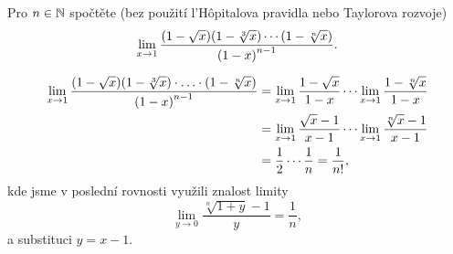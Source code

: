 \documentclass[answers]{exam}
\begin{document}
\begin{questions}
  \question[2] Pro $n \in \mathbb{N}$ spočtěte (bez použití l'Hôpitalova pravidla nebo Taylorova rozvoje)
  \begin{equation*}
    \lim_{x \to 1} 
    \frac{
      \parens{1 - \sqrt{x}} \parens{1 - \sqrt[3]{x}} \cdots \parens{1 - \sqrt[n]{x}}
    }{
      \parens{1 - x}^{n - 1}
    }.
  \end{equation*}
  
  \begin{solution}
    \begin{align*}
      \lim_{x \to 1} 
      \frac{
        \parens{1 - \sqrt{x}} \parens{1 - \sqrt[3]{x}} \cdot \ldots \cdot \parens{1 - \sqrt[n]{x}}
      }{
        \parens{1 - x}^{n - 1}
      }
      &=
      \lim_{x \to 1} \frac{1 - \sqrt{x}}{1 - x} \cdots \lim_{x \to 1} \frac{1 - \sqrt[n]{x}}{1 - x}
      \\
      &=
      \lim_{x \to 1} \frac{\sqrt{x} - 1}{x - 1} \cdots \lim_{x \to 1} \frac{\sqrt[n]{x} - 1}{x - 1}
      \\
      &=
      \frac{1}{2} \cdots \frac{1}{n} = \frac{1}{n!},
    \end{align*}
    kde jsme v poslední rovnosti využili znalost limity
    \begin{equation*}
      \lim_{y \to 0} \frac{\sqrt[n]{1 + y} - 1}{y} = \frac{1}{n},
    \end{equation*}
    a substituci $y = x - 1$.
    
  \end{solution}
   
\end{questions}
\end{document}
